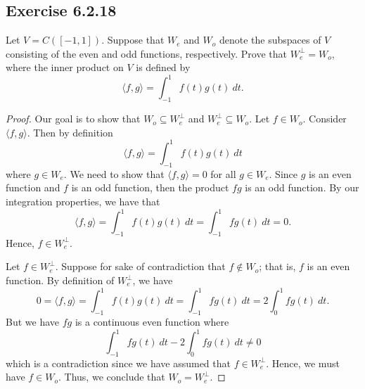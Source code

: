 \subsection*{Exercise 6.2.18} Let \( V = C([-1,1]) \). Suppose that \( {W}_{e} \) and \( {W}_{o} \) denote the subspaces of \( V  \) consisting of the even and odd functions, respectively. Prove that \( W^{\perp}_{e} = W_{o} \), where the inner product on \( V  \) is defined by 
\[  \langle f , g \rangle = \int_{ -1 }^{ 1 }  f(t) g(t) \ dt. \]
\begin{proof}
 Our goal is to show that \( {W}_{o} \subseteq {W}_{e}^{\perp} \) and \( {W}_{e}^{\perp} \subseteq {W}_{o} \). Let \( f \in {W}_{o} \). Consider \( \langle f , g \rangle \). Then by definition 
 \[  \langle f , g \rangle = \int_{ -1 }^{ 1 }  f(t)g(t) \ dt \] where \( g \in {W}_{e} \). We need to show that \( \langle f , g \rangle = 0  \) for all \( g \in {W}_{e} \). Since \( g  \) is an even function and \( f \) is an odd function, then the product \( fg  \) is an odd function. By our integration properties, we have that 
 \[  \langle f , g \rangle = \int_{ -1 }^{ 1 }  f(t) g(t) \ dt = \int_{ -1 }^{ 1 }  fg(t) \ dt = 0.   \]
 Hence, \( f \in {W}_{e}^{\perp} \). 

 Let \( f \in {W}_{e}^{\perp} \). Suppose for sake of contradiction that \( f \notin {W}_{o} \); that is, \( f  \) is an even function. By definition of \( {W}_{e}^{\perp} \), we have
 \[   0 = \langle f , g \rangle = \int_{ -1 }^{ 1 }  f(t) g(t) \ dt = \int_{ -1 }^{ 1  } fg(t)  \ dt = 2 \int_{ 0 }^{ 1 } fg(t) \ dt. \]
 But we have \( fg  \) is a continuous even function where
 \[  \int_{ -1 }^{ 1 }  fg(t) \ dt - 2 \int_{ 0 }^{ 1 } fg(t) \ dt \neq 0 \]
 which is a contradiction since we have assumed that \( f \in {W}_{e}^{\perp} \). Hence, we must have \( f \in {W}_{o} \). Thus, we conclude that \( {W}_{o} = {W}_{e}^{\perp} \).
\end{proof}


